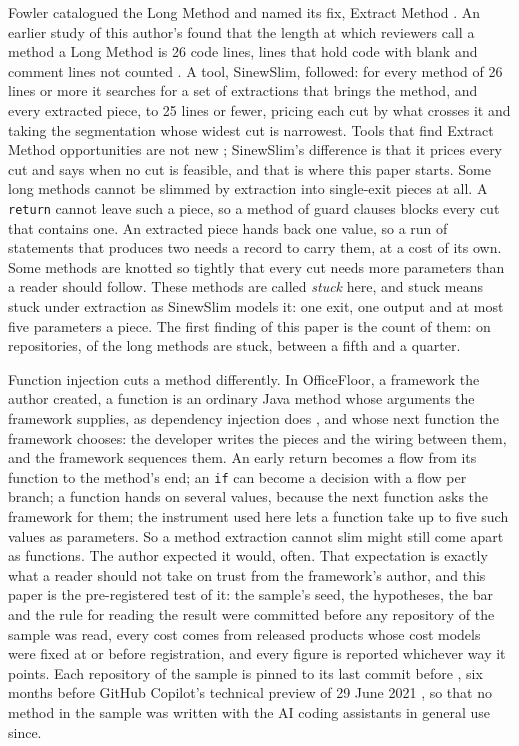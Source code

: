 \documentclass[11pt,a4paper]{article}
\newcommand{\sig}[1]{\texttt{#1}}
\begin{document}
Fowler catalogued the Long Method and named its fix, Extract Method
\cite{fowler1999, fowler2018}. An earlier study of this author's found that
the length at which reviewers call a method a Long Method is 26 code lines,
lines that hold code with blank and comment lines not counted
\cite{longmethod}. A tool, SinewSlim, followed: for every method of 26 lines
or more it searches for a set of extractions that brings the method, and
every extracted piece, to 25 lines or fewer, pricing each cut by what crosses
it and taking the segmentation whose widest cut is narrowest. Tools that find
Extract Method opportunities are not new \cite{tsantalis2011, haas2016};
SinewSlim's difference is that it prices every cut and says when no cut is
feasible, and that is where this paper starts. Some long methods cannot be
slimmed by extraction into single-exit pieces at all. A \sig{return} cannot
leave such a piece, so a method of guard clauses blocks every cut that
contains one. An extracted piece hands back one value, so a run of statements
that produces two needs a record to carry them, at a cost of its own. Some
methods are knotted so tightly that every cut needs more parameters than a
reader should follow. These methods are called \emph{stuck} here, and stuck
means stuck under extraction as SinewSlim models it: one exit, one output and
at most five parameters a piece. The first finding of this paper is the count
of them: on \nUsable{} repositories, \stuckShare{} of the long methods are
stuck, between a fifth and a quarter.

Function injection cuts a method differently. In OfficeFloor, a framework the
author created, a function is an ordinary Java method whose arguments the
framework supplies, as dependency injection does \cite{fowler2004}, and whose
next function the framework chooses: the developer writes the pieces and the
wiring between them, and the framework sequences them. An early return
becomes a flow from its function to the method's end; an \sig{if} can become a
decision with a flow per branch; a function hands on several values, because
the next function asks the framework for them; the instrument used here lets
a function take up to five such values as parameters. So a method extraction
cannot slim might still come apart as functions. The author expected it would, often. That expectation is exactly
what a reader should not take on trust from the framework's author, and this
paper is the pre-registered test of it: the sample's seed, the hypotheses,
the bar and the rule for reading the result were committed before any
repository of the sample was read, every cost comes from released products
whose cost models were fixed at or before registration, and every figure is reported
whichever way it points. Each repository of the sample is pinned to its last
commit before \planAsOf{}, six months before GitHub Copilot's technical
preview of 29 June 2021 \cite{copilot2021}, so that no method in the sample
was written with the AI coding assistants in general use since.
\end{document}
